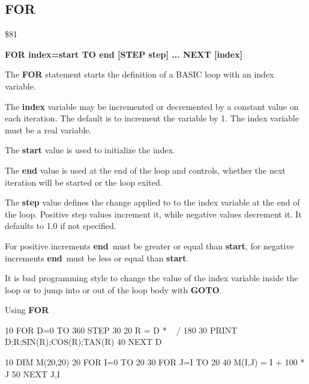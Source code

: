 
\newpage
\subsection{FOR}
\begin{description}[leftmargin=3cm,style=nextline]
\item [Token:] \$81
\item [Format:] {\bf FOR index=start TO end [STEP step] ... NEXT [index]}
\item [Usage:] The {\bf FOR} statement starts the definition
               of a BASIC loop with an index variable.

               The {\bf index} variable may be incremented or decremented
               by a constant value on each iteration. The default
               is to increment the variable by 1.
               The index variable must be a real variable.

               The {\bf start} value is used to initialize the index.

               The {\bf end} value is used at the end of the loop
               and controls, whether the next iteration will be started
               or the loop exited.

               The {\bf step} value defines the change applied to
               to the index variable at the end of the loop.
               Positive step values increment it, while negative values
               decrement it. It defaults to 1.0 if not specified.

\item [Remarks:] For positive increments {\bf end} must be greater
               or equal than {\bf start}, for negative increments
               {\bf end} must be less or equal than {\bf start}.

               It is bad programming style to change the value
               of the index variable inside the loop or to
               jump into or out of the loop body with {\bf GOTO}.

\item [Example:] Using {\bf FOR}
\begin{screenoutput}
10 FOR D=0 TO 360 STEP 30
20 R = D * ~ / 180
30 PRINT D;R;SIN(R);COS(R);TAN(R)
40 NEXT D

10 DIM M(20,20)
20 FOR I=0 TO 20
30 FOR J=I TO 20
40 M(I,J) = I + 100 * J
50 NEXT J,I
\end{screenoutput}
\end{description}

